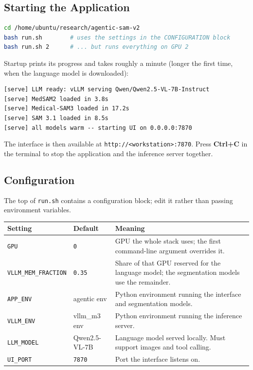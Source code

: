 \documentclass[11pt,a4paper]{article}
\newcommand{\ui}[1]{\textbf{#1}}
\newcommand{\code}[1]{\texttt{\small #1}}
\begin{document}
\subsection{Starting the Application}

\begin{lstlisting}[language=bash]
cd /home/ubuntu/research/agentic-sam-v2
bash run.sh        # uses the settings in the CONFIGURATION block
bash run.sh 2      # ... but runs everything on GPU 2
\end{lstlisting}

Startup prints its progress and takes roughly a minute (longer the first time,
when the language model is downloaded):

\begin{lstlisting}
[serve] LLM ready: vLLM serving Qwen/Qwen2.5-VL-7B-Instruct
[serve] MedSAM2 loaded in 3.8s
[serve] Medical-SAM3 loaded in 17.2s
[serve] SAM 3.1 loaded in 8.5s
[serve] all models warm -- starting UI on 0.0.0.0:7870
\end{lstlisting}

The interface is then available at \code{http://<workstation>:7870}. Press
\ui{Ctrl+C} in the terminal to stop the application and the inference server
together.

\subsection{Configuration}

The top of \code{run.sh} contains a configuration block; edit it rather than
passing environment variables.

\begin{longtable}{@{}p{4.4cm}p{3.4cm}p{7.2cm}@{}}
\toprule
\textbf{Setting} & \textbf{Default} & \textbf{Meaning} \\
\midrule
\endhead
\code{GPU} & \code{0} & GPU the whole stack uses; the first command-line
argument overrides it. \\
\code{VLLM\_MEM\_FRACTION} & \code{0.35} & Share of that GPU reserved for the
language model; the segmentation models use the remainder. \\
\code{APP\_ENV} & agentic env & Python environment running the interface and
segmentation models. \\
\code{VLLM\_ENV} & vllm\_m3 env & Python environment running the inference
server. \\
\code{LLM\_MODEL} & Qwen2.5-VL-7B & Language model served locally. Must
support images and tool calling. \\
\code{UI\_PORT} & \code{7870} & Port the interface listens on. \\
\bottomrule
\end{longtable}
\end{document}
